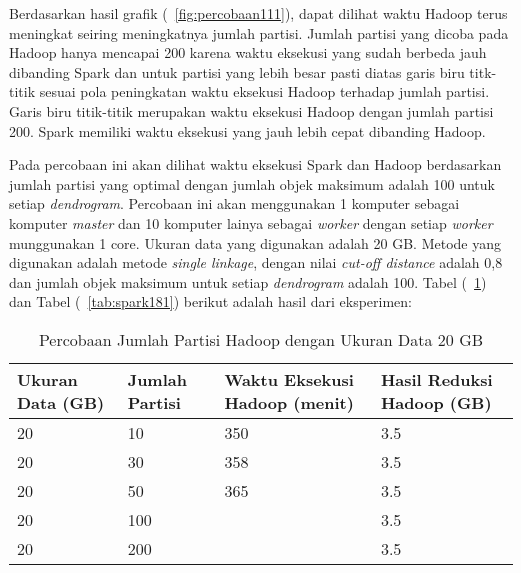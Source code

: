 Berdasarkan hasil grafik (~\ref{fig:percobaan111}), dapat dilihat waktu Hadoop terus meningkat seiring meningkatnya jumlah partisi. Jumlah partisi yang dicoba pada Hadoop hanya mencapai 200 karena waktu eksekusi yang sudah berbeda jauh dibanding Spark dan untuk partisi yang lebih besar pasti diatas garis biru titk-titik sesuai pola peningkatan waktu eksekusi Hadoop terhadap jumlah partisi. Garis biru titik-titik merupakan waktu eksekusi Hadoop dengan jumlah partisi 200. Spark memiliki waktu eksekusi yang jauh lebih cepat dibanding Hadoop. 




Pada percobaan ini akan dilihat waktu eksekusi Spark dan Hadoop berdasarkan jumlah partisi yang optimal dengan jumlah objek maksimum adalah 100 untuk setiap \textit{dendrogram}. Percobaan ini akan menggunakan 1 komputer sebagai komputer \textit{master} dan 10 komputer lainya sebagai \textit{worker} dengan setiap \textit{worker} munggunakan 1 core. Ukuran data yang digunakan adalah 20 GB. Metode yang digunakan adalah metode \textit{single linkage}, dengan nilai \textit{cut-off distance} adalah 0,8 dan jumlah objek maksimum untuk setiap \textit{dendrogram} adalah 100. Tabel (~\ref{tab:spark171}) dan Tabel (~\ref{tab:spark181}) berikut adalah hasil dari eksperimen:





\begin{table}[H] 
	\centering 
	\caption{Percobaan Jumlah Partisi Hadoop dengan Ukuran Data 20 GB}
	\label{tab:spark171}
	\begin{tabular}{|p{3cm}|p{3cm}|p{4cm}|p{4cm}|}
\hline
Ukuran Data (GB) & Jumlah Partisi &  Waktu Eksekusi Hadoop (menit) & Hasil Reduksi Hadoop (GB)\\
\hline
20 & 10 & 350  & 3.5  \\
\hline
20 & 30 & 358  & 3.5  \\
\hline
20 & 50 & 365  & 3.5  \\
\hline
20 & 100 &   & 3.5  \\
\hline
20 & 200 &   & 3.5  \\
\hline


\hline

	\end{tabular} 
\end{table}




